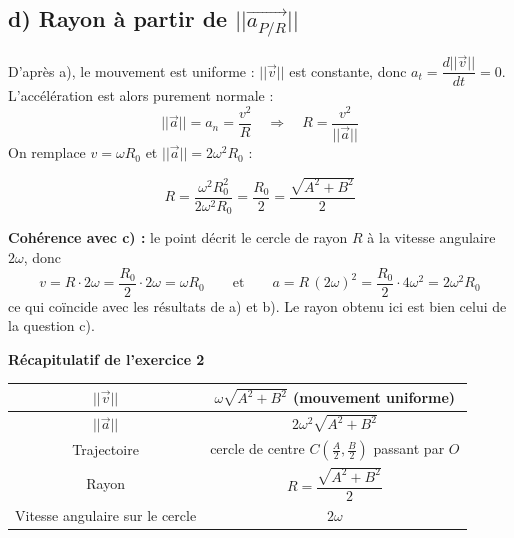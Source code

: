 \documentclass[11pt,a4paper]{article}
\begin{document}
\begin{center}
\end{center}

\subsection*{d) Rayon à partir de $||\vec{a_{P/R}}||$}
D'après a), le mouvement est uniforme : $||\vec{v}||$ est constante, donc $a_t = \dfrac{d||\vec{v}||}{dt} = 0$. L'accélération est alors purement normale :
$$ ||\vec{a}|| = a_n = \frac{v^2}{R} \quad\Longrightarrow\quad R = \frac{v^2}{||\vec{a}||} $$
On remplace $v = \omega R_0$ et $||\vec{a}|| = 2\omega^2R_0$ :
\begin{sonucbox}
$$ R = \frac{\omega^2R_0^2}{2\omega^2R_0} = \frac{R_0}{2} = \frac{\sqrt{A^2+B^2}}{2} $$
\end{sonucbox}
\textbf{Cohérence avec c) :} le point décrit le cercle de rayon $R$ à la vitesse angulaire $2\omega$, donc
$$ v = R\cdot 2\omega = \frac{R_0}{2}\cdot 2\omega = \omega R_0 \qquad\text{et}\qquad a = R\,(2\omega)^2 = \frac{R_0}{2}\cdot 4\omega^2 = 2\omega^2R_0 $$
ce qui coïncide avec les résultats de a) et b). Le rayon obtenu ici est bien celui de la question c).

\begin{sonucbox}
\textbf{Récapitulatif de l'exercice 2}
\begin{center}
\renewcommand{\arraystretch}{1.8}
\begin{tabular}{|c|c|}
\hline
$||\vec{v}||$ & $\omega\sqrt{A^2+B^2}$ (mouvement uniforme) \\
\hline
$||\vec{a}||$ & $2\omega^2\sqrt{A^2+B^2}$ \\
\hline
Trajectoire & cercle de centre $C\left(\frac{A}{2},\frac{B}{2}\right)$ passant par $O$ \\
\hline
Rayon & $R=\dfrac{\sqrt{A^2+B^2}}{2}$ \\
\hline
Vitesse angulaire sur le cercle & $2\omega$ \\
\hline
\end{tabular}
\end{center}
\end{sonucbox}
\end{document}
